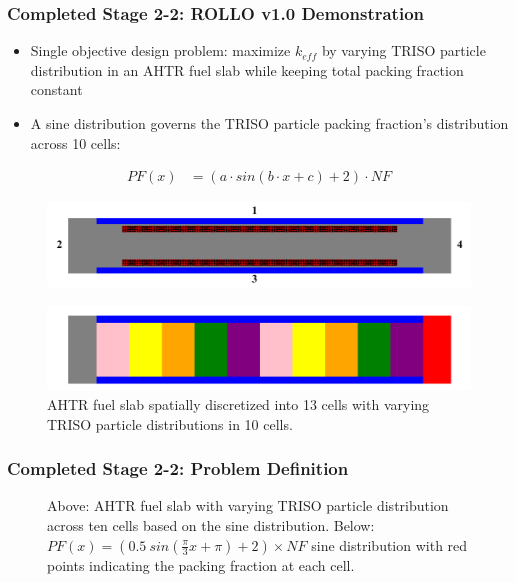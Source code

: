 \begin{frame}
    \frametitle{Completed Stage 2-2: ROLLO v1.0 Demonstration}
    \begin{itemize}
        \item Single objective design problem: maximize $k_{eff}$ by varying 
        TRISO particle distribution in an AHTR fuel slab while keeping total 
        packing fraction constant
        \item A sine distribution governs the TRISO particle packing fraction's 
        distribution across 10 cells:
    \end{itemize}
    \begin{align*}
        PF(x) &= \left(a\cdot sin(b\cdot x + c) + 2\right) \cdot NF
    \end{align*}
    \begin{figure}[]
        \centering
        \includegraphics[width=0.6\linewidth]{../docs/figures/straightened_slab.png} 
    \end{figure}
    \begin{figure}[]
        \includegraphics[width=0.6\linewidth]{../docs/figures/straightened_slab_mg.png}
        \caption{AHTR fuel slab spatially discretized into 13 cells with varying 
        TRISO particle distributions in 10 cells.}
    \end{figure}
\end{frame}

\begin{frame}
    \frametitle{Completed Stage 2-2: Problem Definition}
    \begin{figure}[]
        \centering
        \caption{Above: AHTR fuel slab with varying TRISO particle 
        distribution across ten cells based on the sine distribution. 
        Below: $PF(x) = (0.5\ sin(\frac{\pi}{3}x + \pi) + 2)  \times NF$ 
        sine distribution with red points indicating the packing fraction at each cell.}
    \end{figure}
\end{frame}

